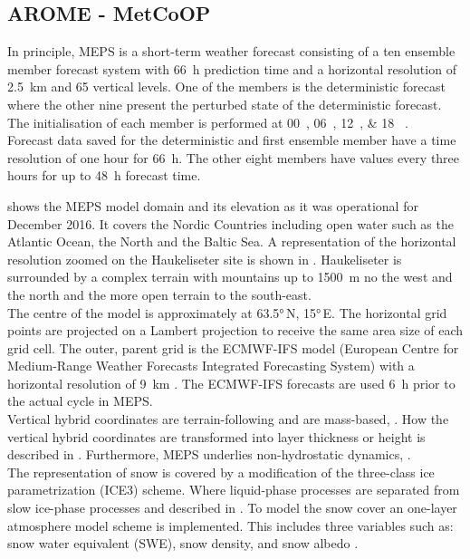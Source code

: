 \subsection{AROME - MetCoOP}
In principle, MEPS is a short-term weather forecast consisting of a ten ensemble member  forecast system with \SI{66}{\hour} prediction time and a horizontal resolution of \SI{2.5}{\km} and 65 vertical levels. One of the members is the deterministic forecast where the other nine present the perturbed state of the deterministic forecast. The initialisation of each member is performed at \SIlist{00;06;12;18}{\UTC} \citep{metcoop_wiki_description_2017}.
\\ 
Forecast data saved for the deterministic and first ensemble member have a time resolution of one hour for \SI{66}{\hour}. The other eight members have values every three hours for up to \SI{48}{\hour} forecast time.

\noindent
{} shows the MEPS model domain and its elevation as it was operational for December 2016. It covers the Nordic Countries including open water such as the Atlantic Ocean, the North and the Baltic Sea. A representation of the horizontal resolution zoomed on the Haukeliseter site is shown in . Haukeliseter is surrounded by a complex terrain with mountains up to \SI{1500}{\metre} no the west and the north and the more open terrain to the south-east.
\\
The centre of the model is approximately at \ang{63.5}\,N, \ang{15}\,E. 
The horizontal grid points are projected on a Lambert projection to receive the same area size of each grid cell. 
The outer, parent grid is the ECMWF-IFS model (European Centre for Medium-Range Weather Forecasts Integrated Forecasting System) with a horizontal resolution of \SI{9}{\km} \citep{homleid_verification_2016}. The ECMWF-IFS forecasts are used \SI{6}{\hour} prior to the actual cycle in MEPS.
\\
Vertical hybrid coordinates are terrain-following and are mass-based, \citep{muller_arome-metcoop:_2017}. How the vertical hybrid coordinates are transformed into layer thickness or height is described in . Furthermore, MEPS underlies non-hydrostatic dynamics, \citet{metcoop_wiki_description_2017}.
\\
The representation of snow is covered by a modification of the three-class ice parametrization (ICE3) scheme. Where liquid-phase processes are separated from slow ice-phase processes and described in . To model the snow cover an one-layer atmosphere model scheme is implemented. This includes three variables such as: snow water equivalent (SWE), snow density, and snow albedo \citep{muller_arome-metcoop:_2017}.
